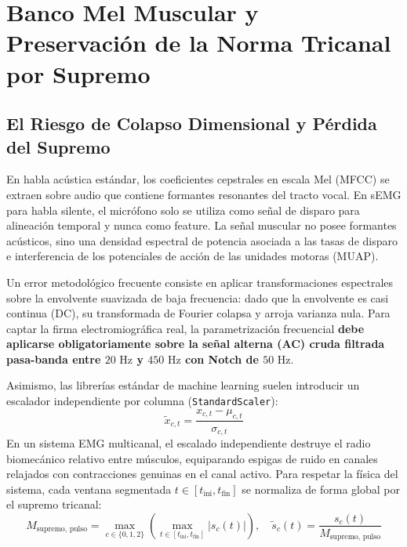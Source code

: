 \section{Banco Mel Muscular y Preservación de la Norma Tricanal por Supremo}
\label{sec:mel_muscular_matematica}

\subsection{El Riesgo de Colapso Dimensional y Pérdida del Supremo}
En habla acústica estándar, los coeficientes cepstrales en escala Mel (MFCC) se extraen sobre audio que contiene formantes resonantes del tracto vocal. En sEMG para habla silente, el micrófono solo se utiliza como señal de disparo para alineación temporal y nunca como feature. La señal muscular no posee formantes acústicos, sino una densidad espectral de potencia asociada a las tasas de disparo e interferencia de los potenciales de acción de las unidades motoras (MUAP).

Un error metodológico frecuente consiste en aplicar transformaciones espectrales sobre la envolvente suavizada de baja frecuencia: dado que la envolvente es casi continua (DC), su transformada de Fourier colapsa y arroja varianza nula. Para captar la firma electromiográfica real, la parametrización frecuencial \textbf{debe aplicarse obligatoriamente sobre la señal alterna (AC) cruda filtrada pasa-banda entre $20\text{ Hz}$ y $450\text{ Hz}$ con Notch de $50\text{ Hz}$}.

Asimismo, las librerías estándar de machine learning suelen introducir un escalador independiente por columna (\texttt{StandardScaler}):
$$\tilde{x}_{c, t} = \frac{x_{c, t} - \mu_{c, t}}{\sigma_{c, t}}$$
En un sistema EMG multicanal, el escalado independiente destruye el radio biomecánico relativo entre músculos, equiparando espigas de ruido en canales relajados con contracciones genuinas en el canal activo. Para respetar la física del sistema, cada ventana segmentada $t \in [t_{\text{ini}}, t_{\text{fin}}]$ se normaliza de forma global por el supremo tricanal:
\begin{equation}
M_{\text{supremo, pulso}} = \max_{c \in \{0, 1, 2\}} \left( \max_{t \in [t_{\text{ini}}, t_{\text{fin}}]} |s_c(t)| \right), \quad \tilde{s}_c(t) = \frac{s_c(t)}{M_{\text{supremo, pulso}}}
\end{equation}


